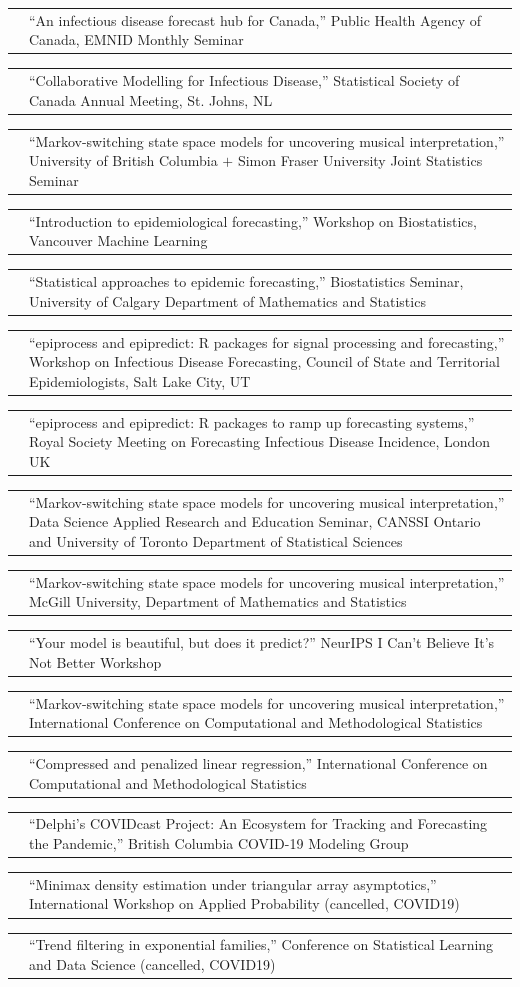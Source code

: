 \documentclass[11pt,letterpaper]{minimal/moderncv}
\makeatletter
\renewcommand*{\cvitem}[2]{%
  \begin{tabular}{@{}p{\hintscolumnwidth}@{\hspace{\separatorcolumnwidth}}%
    p{\maincolumnwidth}@{}}%
    \raggedleft {#1} &  {#2}%
  \end{tabular}%
}
\makeatother
\begin{document}
\cvitem{2024}{``An infectious disease forecast hub for Canada,'' Public Health 
  Agency of Canada, EMNID Monthly Seminar}
\cvitem{}{``Collaborative Modelling for Infectious Disease,'' Statistical Society of Canada Annual Meeting, St. Johns, NL}
\cvitem{}{``Markov-switching state space models for uncovering musical 
  interpretation,'' University of British Columbia $+$ Simon Fraser University
  Joint Statistics Seminar}
\cvitem{}{``Introduction to epidemiological forecasting,'' Workshop on Biostatistics,
  Vancouver Machine Learning}

\cvitem{2023}{``Statistical approaches to epidemic forecasting,'' Biostatistics 
  Seminar, University of Calgary Department of Mathematics and Statistics}
\cvitem{}{``epiprocess and epipredict: R packages for signal processing and forecasting,'' Workshop on Infectious Disease Forecasting, Council of State and Territorial Epidemiologists, Salt Lake City, UT}
\cvitem{}{``epiprocess and epipredict: R packages to ramp up forecasting systems,'' Royal Society Meeting on Forecasting Infectious Disease Incidence, London UK}

\cvitem{2022}{``Markov-switching state space models for uncovering musical
  interpretation,'' Data Science Applied Research and Education Seminar, CANSSI
  Ontario and University of Toronto Department of Statistical Sciences}
\cvitem{}{``Markov-switching state space models for uncovering musical
  interpretation,'' McGill University, Department of Mathematics and Statistics}


\cvitem{2021}{``Your model is beautiful, but does it predict?'' NeurIPS
  I Can't Believe It's Not Better Workshop}
\cvitem{}{``Markov-switching state space models for uncovering musical
  interpretation,'' International Conference on Computational and
  Methodological Statistics}

\cvitem{2020}{``Compressed and penalized linear regression,''
  International Conference on Computational and Methodological Statistics}

\cvitem{}{``Delphi's COVIDcast Project: 
  An Ecosystem for Tracking and Forecasting the Pandemic,'' British Columbia
  COVID-19 Modeling Group}

\cvitem{}{``Minimax density estimation under triangular array asymptotics,''
  International Workshop on Applied Probability (cancelled, COVID19)} 

\cvitem{}{``Trend filtering in exponential families,'' Conference
    on Statistical Learning and Data Science (cancelled, COVID19)}
\end{document}
